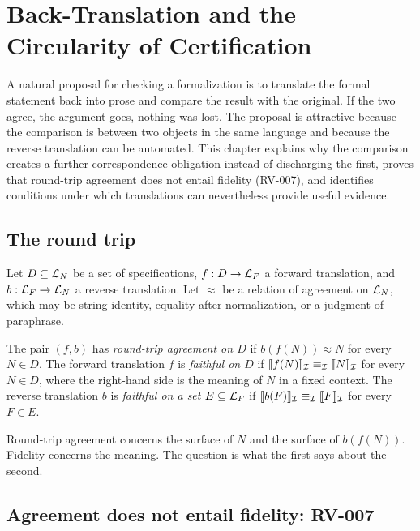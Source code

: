 \chapter{Back-Translation and the Circularity of Certification}
\label{ch:backtrans}

A natural proposal for checking a formalization is to translate the formal statement back into prose and compare the result with the original. If the two agree, the argument goes, nothing was lost. The proposal is attractive because the comparison is between two objects in the same language and because the reverse translation can be automated. This chapter explains why the comparison creates a further correspondence obligation instead of discharging the first, proves that round-trip agreement does not entail fidelity (RV-007), and identifies conditions under which translations can nevertheless provide useful evidence.

\section{The round trip}

Let $D \subseteq \mathcal{L}_N$ be a set of specifications, $f : D \to \mathcal{L}_F$ a forward translation, and $b : \mathcal{L}_F \to \mathcal{L}_N$ a reverse translation. Let $\approx$ be a relation of agreement on $\mathcal{L}_N$, which may be string identity, equality after normalization, or a judgment of paraphrase.

\begin{definition}
\label{def:roundtrip}
The pair $(f,b)$ has \emph{round-trip agreement on $D$} if $b(f(N)) \approx N$ for every $N \in D$. The forward translation $f$ is \emph{faithful on $D$} if $\llbracket f(N) \rrbracket_{\mathcal{I}} \equiv_{\mathcal{I}} \llbracket N \rrbracket_{\mathcal{I}}$ for every $N \in D$, where the right-hand side is the meaning of $N$ in a fixed context. The reverse translation $b$ is \emph{faithful on a set $E \subseteq \mathcal{L}_F$} if $\llbracket b(F) \rrbracket_{\mathcal{I}} \equiv_{\mathcal{I}} \llbracket F \rrbracket_{\mathcal{I}}$ for every $F \in E$.
\end{definition}

Round-trip agreement concerns the surface of $N$ and the surface of $b(f(N))$. Fidelity concerns the meaning. The question is what the first says about the second.

\section{Agreement does not entail fidelity: RV-007}

